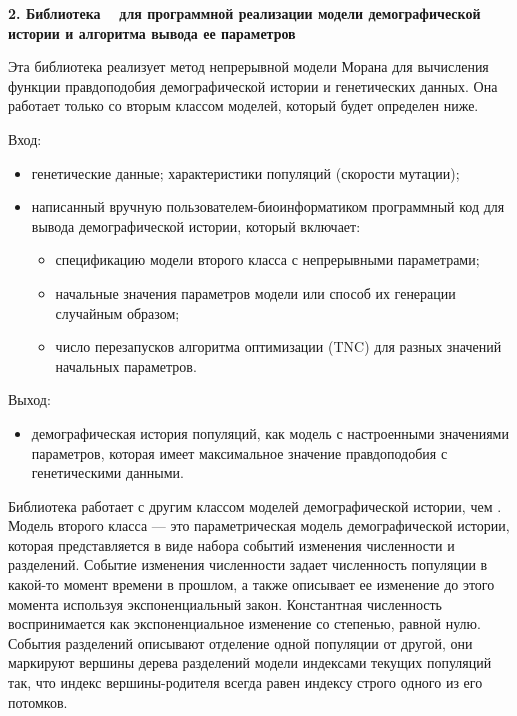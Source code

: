 \documentclass[a4paper,14pt,oneside,openany,article]{memoir}
\begin{document}


\textbf{2. Библиотека \momi~ для программной реализации модели демографической истории и алгоритма вывода ее параметров}

Эта библиотека реализует метод непрерывной модели Морана для вычисления функции правдоподобия демографической истории и генетических данных.
Она работает только со вторым классом моделей, который будет определен ниже.

Вход:
\begin{itemize}
    \item генетические данные; характеристики популяций (скорости мутации);
    \item написанный вручную пользователем-биоинформатиком программный код для вывода демографической истории, который включает:
    \begin{itemize}
        \item спецификацию модели второго класса с непрерывными параметрами;
        \item начальные значения параметров модели или способ их генерации случайным образом;
        \item число перезапусков алгоритма оптимизации (TNC) для разных значений начальных параметров.
    \end{itemize}
\end{itemize}

Выход:
\begin{itemize}
    \item демографическая история популяций, как модель с настроенными значениями параметров, которая имеет максимальное значение правдоподобия с генетическими данными.\\
\end{itemize}

Библиотека \momi работает с другим классом моделей демографической истории, чем \dadi.
Модель второго класса --- это параметрическая модель демографической истории, которая представляется в виде набора событий изменения численности и разделений.
Событие изменения численности задает численность популяции в какой-то момент времени в прошлом, а также описывает ее изменение до этого момента используя экспоненциальный закон.
Константная численность воспринимается как экспоненциальное изменение со степенью, равной нулю.
События разделений описывают отделение одной популяции от другой, они маркируют вершины дерева разделений модели индексами текущих популяций так, что индекс вершины-родителя всегда равен индексу строго одного из его потомков.
\end{document}
